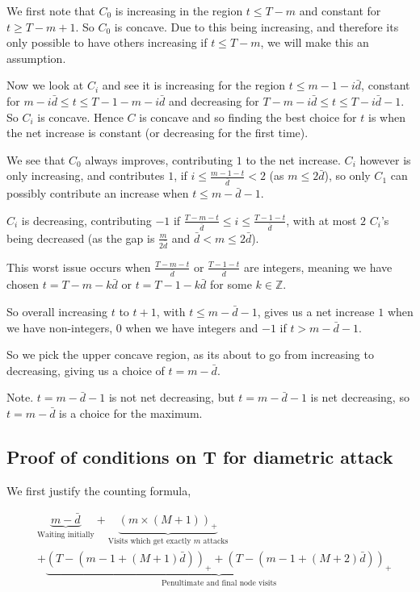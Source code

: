 \documentclass[a4paper,10pt]{article}
\newcommand{\pospart}[1]{\left( #1 \right)_{+}}
\theoremstyle{definition}
\theoremstyle{definition}
\theoremstyle{remark}
\theoremstyle{definition}
\begin{document}
We first note that $C_{0}$ is increasing in the region $t \leq T-m$ and constant for $t \geq T-m+1$. So $C_{0}$ is concave. Due to this being increasing, and therefore its only possible to have others increasing if $t \leq T-m$, we will make this an assumption.

Now we look at $C_{i}$ and see it is increasing for the region $t \leq m-1-i\bar{d}$, constant for $m-i\bar{d} \leq t \leq T-1-m-i \bar{d}$ and decreasing for $ T-m-i \bar{d} \leq t \leq T-i \bar{d}-1$. So $C_{i}$ is concave. Hence $C$ is concave and so finding the best choice for $t$ is when the net increase is constant (or decreasing for the first time).

We see that $C_{0}$ always improves, contributing $1$ to the net increase. $C_{i}$ however is only increasing, and contributes $1$, if $i \leq \frac{m-1-t}{\bar{d}} < 2$ (as $m \leq 2\bar{d}$), so only $C_{1}$ can possibly contribute an increase when $t \leq m-\bar{d}-1$.

$C_{i}$ is decreasing, contributing $-1$ if $\frac{T-m-t}{\bar{d}} \leq i \leq \frac{T-1-t}{\bar{d}}$, with at most $2$ $C_{i}$'s being decreased (as the gap is $\frac{m}{2 \bar{d}}$ and $\bar{d} < m \leq 2 \bar{d}$).

This worst issue occurs when $\frac{T-m-t}{\bar{d}}$ or $\frac{T-1-t}{\bar{d}}$ are integers, meaning we have chosen $t=T-m-k\bar{d}$ or $t=T-1-k\bar{d}$ for some $k \in \mathbb{Z}$.

So overall increasing $t$ to $t+1$, with $t \leq m-\bar{d}-1$, gives us a net increase $1$ when we have non-integers, $0$ when we have integers  and $-1$ if $t > m- \bar{d}-1$.

So we pick the upper concave region, as its about to go from increasing to decreasing, giving us a choice of $t=m-\bar{d}$.
 
Note. $t=m-\bar{d}-1$ is not net decreasing, but $t=m-\bar{d}-1$ is net decreasing, so $t=m-\bar{d}$ is a choice for the maximum.

\subsection{Proof of conditions on T for diametric attack}
\label{Appendix:Proof of conditions on T for diametric attack}

We first justify the counting formula,

\begin{align*}
&\underbrace{m-\bar{d}}_{\text{Waiting initially}} + \underbrace{\pospart{m \times \left( M +1 \right)}}_{\text{Visits which get exactly } m \text{ attacks}} \\
&+ \underbrace{\pospart{T- \left( m-1 + \left(M +1 \right) \bar{d} \right)}+\pospart{T- \left( m-1 + \left(M +2 \right) \bar{d} \right)}}_{\text{Penultimate and final node visits}} 
\end{align*}
\end{document}
